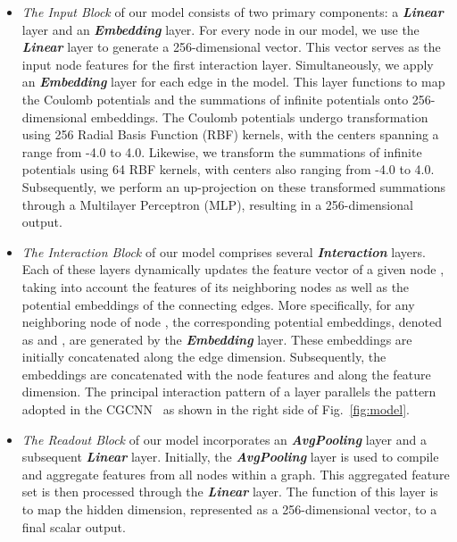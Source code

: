 \documentclass[nohyperref]{article}
\theoremstyle{plain}
\theoremstyle{definition}
\theoremstyle{remark}
\begin{document}
\begin{itemize}
\item \textit{The Input Block} of our model consists of two primary components: a \textit{\textbf{Linear}} layer and an \textit{\textbf{Embedding}} layer. For every node  in our model, we use the \textit{\textbf{Linear}} layer to generate a 256-dimensional vector. This vector serves as the input node features for the first interaction layer. Simultaneously, we apply an \textit{\textbf{Embedding}} layer for each edge in the model. This layer functions to map the Coulomb potentials and the summations of infinite potentials onto 256-dimensional embeddings. The Coulomb potentials undergo transformation using 256 Radial Basis Function (RBF) kernels, with the centers spanning a range from -4.0 to 4.0. Likewise, we transform the summations of infinite potentials using 64 RBF kernels, with centers also ranging from -4.0 to 4.0. Subsequently, we perform an up-projection on these transformed summations through a Multilayer Perceptron (MLP), resulting in a 256-dimensional output.

\item \textit{The Interaction Block} of our model comprises several \textit{\textbf{Interaction}} layers. Each of these layers dynamically updates the feature vector of a given node , taking into account the features of its neighboring nodes as well as the potential embeddings of the connecting edges. More specifically, for any neighboring node  of node , the corresponding potential embeddings, denoted as  and , are generated by the \textit{\textbf{Embedding}} layer. These embeddings are initially concatenated along the edge dimension. Subsequently, the embeddings are concatenated with the node features  and  along the feature dimension. The principal interaction pattern of a layer parallels the pattern adopted in the CGCNN~\citep{xie2018crystal} as shown in the right side of Fig.~\ref{fig:model}. 

\item \textit{The Readout Block} of our model incorporates an \textit{\textbf{AvgPooling}} layer and a subsequent \textit{\textbf{Linear}} layer. Initially, the \textit{\textbf{AvgPooling}} layer is used to compile and aggregate features from all nodes within a graph. This aggregated feature set is then processed through the \textit{\textbf{Linear}} layer. The function of this layer is to map the hidden dimension, represented as a 256-dimensional vector, to a final scalar output.

\end{itemize}
\end{document}
